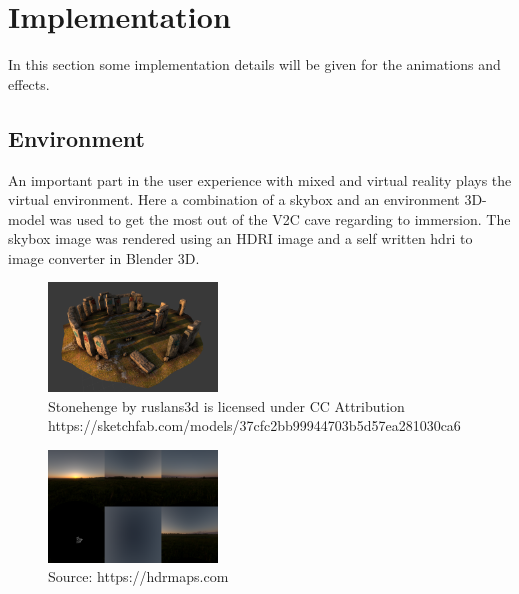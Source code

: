 \section{Implementation}

In this section some implementation details will be given for the animations and effects.

\subsection{Environment}
An important part in the user experience with mixed and virtual reality plays the virtual environment. Here a combination of a skybox and an environment 3D-model was used to get the most out of the V2C cave regarding to immersion. The skybox image was rendered using an HDRI image and a self written hdri to image converter in Blender 3D.

\begin{figure}[!ht]
\includegraphics[width=0.4\textwidth]{pictures/stonehenge.png}
\caption{Stonehenge by ruslans3d is licensed under CC Attribution https://sketchfab.com/models/37cfc2bb99944703b5d57ea281030ca6}
\end{figure}

\begin{figure}[!ht]
\includegraphics[width=0.4\textwidth]{pictures/EnvMap_cube_1024.png}
\caption{Source: https://hdrmaps.com }
\end{figure}

\vfill


